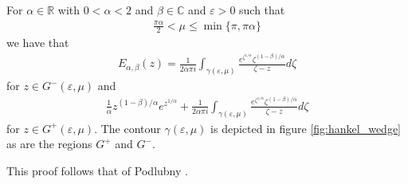 \begin{mdframed}[innertopmargin=10pt]
\begin{lemma}
    \label{lem:mit_lef_contour_1}
    For $ \alpha \in \mathbb{R} $ with $ 0 < \alpha < 2 $ and $ \beta \in \mathbb{C} $ and $ \varepsilon > 0 $
    such that
    \begin{align}
        \label{eq:mit_lef_region}
	    \frac{\pi \alpha}{2} < \mu \leq \min\{ \pi, \pi \alpha \}
    \end{align}
    we have that
    \begin{align}
	    \label{eq:mit_lef_contour_1}
        E_{\alpha, \beta}(z) = \frac{1}{2\alpha\pi i} \int_{\gamma(\varepsilon, \mu)} \frac{e^{\zeta^{1 / \alpha}}\zeta^{(1-\beta)/\alpha}}{\zeta - z} d\zeta
    \end{align}
    for $ z \in G^{-}(\varepsilon, \mu) $
    and
    \begin{align}
    \label{eq:mit_lef_contour_2}
	\frac{1}{\alpha} z^{(1-\beta) / \alpha} e^{z^{1 / \alpha}} + \frac{1}{2\alpha\pi i} \int_{\gamma(\varepsilon, \mu)} \frac{e^{\zeta^{1 / \alpha}}\zeta^{(1-\beta)/\alpha}}{\zeta - z} d\zeta
    \end{align}
    for $ z \in G^{+}(\varepsilon, \mu) $.
    The contour $ \gamma(\varepsilon, \mu) $ is depicted in figure \ref{fig:hankel_wedge} as are the regions $ G^+ $ and $ G^-$.
\end{lemma}
\end{mdframed}
This proof follows that of Podlubny \cite{Podlubny1999}.
